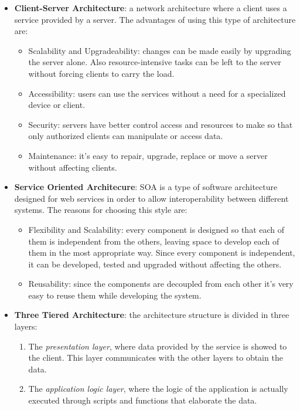 \documentclass[english]{article}
\begin{document}
\begin{itemize}
  \item{\textbf{Client-Server Architecture}: a network architecture where a client uses a service provided by a server. The advantages of using this type of architecture are:
    \begin{itemize}
      \item{Scalability and Upgradeability: changes can be made easily by upgrading the server alone. Also resource-intensive tasks can be left to the server without forcing clients to carry the load.}
      \item{Accessibility: users can use the services without a need for a specialized device or client.}
      \item{Security: servers have better control access and resources to make so that only authorized clients can manipulate or access data.}
      \item{Maintenance: it’s easy to repair, upgrade, replace or move a server without affecting clients.}
    \end{itemize}
  }
  \item{\textbf{Service Oriented Architecure}: SOA is a type of software architecture designed for web services in order to allow interoperability between different systems. The reasons for choosing this style are:
    \begin{itemize}
      \item{Flexibility and Scalability: every component is designed so that each of them is independent from the others, leaving space to develop each of them in the most appropriate way.
      Since every component is independent, it can be developed, tested and upgraded without affecting the others.}
      \item{Reusability: since the components are decoupled from each other it's very easy to reuse them while developing the system.}
      \end{itemize}
  }
  \item{\textbf{Three Tiered Architecture}: the architecture structure is divided in three layers:
  	\begin{enumerate}
  		\item{The \textit{presentation layer}, where data provided by the service is showed to the client. This layer communicates with the other layers to obtain the data.}
  		\item{The \textit{application logic layer}, where the logic of the application is actually executed through scripts and functions that elaborate the data.}

\end{enumerate}}
\end{itemize}
\end{document}
